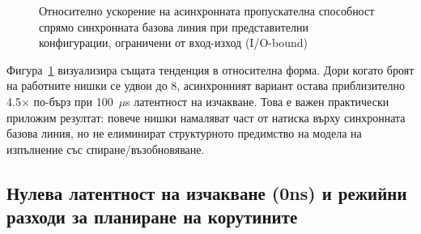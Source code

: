 \begin{figure}[H]
\centering
{}
\caption{Относително ускорение на асинхронната пропускателна способност спрямо синхронната базова линия при представителни конфигурации, ограничени от вход-изход (I/O-bound)}
\label{fig:async_speedup_cases}
\end{figure}

Фигура~\ref{fig:async_speedup_cases} визуализира същата тенденция в относителна форма. Дори когато броят на работните нишки се удвои до 8, асинхронният вариант остава приблизително 4.5$\times$ по-бърз при 100~$\mu$s латентност на изчакване. Това е важен практически приложим резултат: повече нишки намаляват част от натиска върху синхронната базова линия, но не елиминират структурното предимство на модела на изпълнение със спиране/възобновяване.

\subsection{Нулева латентност на изчакване (0ns) и режийни разходи за планиране на корутините}

